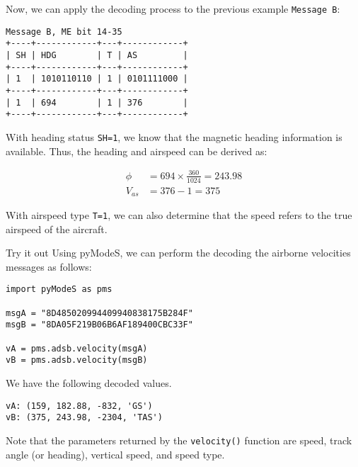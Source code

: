 Now, we can apply the decoding process to the previous example \texttt{Message B}:

\begin{verbatim}
Message B, ME bit 14-35
+----+------------+---+------------+
| SH | HDG        | T | AS         |
+----+------------+---+------------+
| 1  | 1010110110 | 1 | 0101111000 |
+----+------------+---+------------+
| 1  | 694        | 1 | 376        |
+----+------------+---+------------+
\end{verbatim}

With heading status \texttt{SH=1}, we know that the magnetic heading information is available. Thus, the heading and airspeed can be derived as:

\begin{align}
  \phi &= 694 \times \frac{360}{1024} = 243.98 \\
  V_{as} &= 376 - 1 = 375
\end{align}

With airspeed type \texttt{T=1}, we can also determine that the speed refers to the true airspeed of the aircraft.


\begin{notebox}{Try it out}
Using pyModeS, we can perform the decoding the airborne velocities messages as follows: 

\begin{verbatim}
import pyModeS as pms

msgA = "8D485020994409940838175B284F"
msgB = "8DA05F219B06B6AF189400CBC33F"

vA = pms.adsb.velocity(msgA)
vB = pms.adsb.velocity(msgB)
\end{verbatim}

We have the following decoded values.

\begin{verbatim}
vA: (159, 182.88, -832, 'GS')
vB: (375, 243.98, -2304, 'TAS')
\end{verbatim}

Note that the parameters returned by the \texttt{velocity()} function are speed, track angle (or heading), vertical speed, and speed type.

\end{notebox}
  
